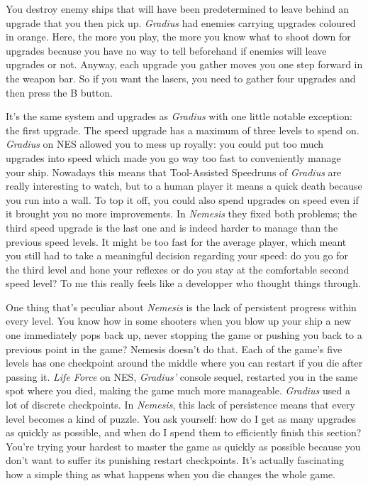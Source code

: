 \documentclass{book}
\let\oldcenter\center
\let\oldendcenter\endcenter
\renewenvironment{center}{\setlength\topsep{0pt}\oldcenter}{\oldendcenter}
\begin{document}
You destroy enemy ships that will have been predetermined to leave behind an upgrade that you then pick up. \emph{Gradius} had enemies carrying upgrades coloured in orange. Here, the more you play, the more you know what to shoot down for upgrades because you have no way to tell beforehand if enemies will leave upgrades or not. Anyway, each upgrade you gather moves you one step forward in the weapon bar. So if you want the lasers, you need to gather four upgrades and then press the B button.

It’s the same system and upgrades as \emph{Gradius} with one little notable exception: the first upgrade. The speed upgrade has a maximum of three levels to spend on. \emph{Gradius} on NES allowed you to mess up royally: you could put too much upgrades into speed which made you go way too fast to conveniently manage your ship. Nowadays this means that Tool-Assisted Speedruns of \emph{Gradius} are really interesting to watch, but to a human player it means a quick death because you run into a wall. To top it off, you could also spend upgrades on speed even if it brought you no more improvements. In \emph{Nemesis} they fixed both problems; the third speed upgrade is the last one and is indeed harder to manage than the previous speed levels. It might be too fast for the average player, which meant you still had to take a meaningful decision regarding your speed: do you go for the third level and hone your reflexes or do you stay at the comfortable second speed level? To me this really feels like a developper who thought things through.

\begin{center}
\quad\vspace{4pt}
\quad\vspace{4pt}
\end{center}

One thing that’s peculiar about \emph{Nemesis} is the lack of persistent progress within every level. You know how in some shooters when you blow up your ship a new one immediately pops back up, never stopping the game or pushing you back to a previous point in the game? Nemesis doesn’t do that. Each of the game’s five levels has one checkpoint around the middle where you can restart if you die after passing it. \emph{Life Force} on NES, \emph{Gradius’} console sequel, restarted you in the same spot where you died, making the game much more manageable. \emph{Gradius} used a lot of discrete checkpoints. In \emph{Nemesis}, this lack of persistence means that every level becomes a kind of puzzle. You ask yourself: how do I get as many upgrades as quickly as possible, and when do I spend them to efficiently finish this section? You’re trying your hardest to master the game as quickly as possible because you don’t want to suffer its punishing restart checkpoints. It’s actually fascinating how a simple thing as what happens when you die changes the whole game.
\end{document}
